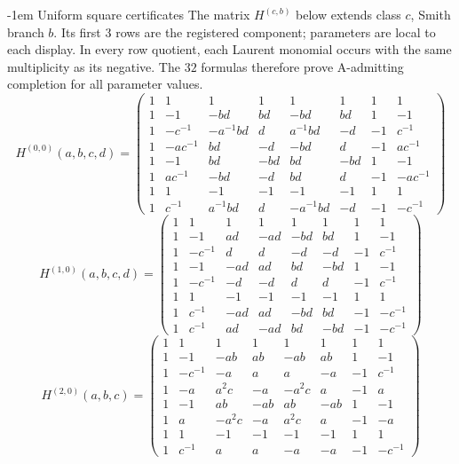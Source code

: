 \documentclass[11pt,a4paper]{article}
\makeatletter
\theoremstyle{plain}
\theoremstyle{definition}
\numberwithin{equation}{section}
\renewcommand\subsection{\@startsection{subsection}{2}{\z@}  {\medskipamount}  {-1em}  {\normalfont\normalsize\bfseries}}
\makeatother
\begin{document}
\subsection{Uniform square certificates}\label{app:uniformcerts}
The matrix $H^{(c,b)}$ below extends class $c$, Smith branch $b$. Its first $3$ rows are the registered component; parameters are local to each display. In every row quotient, each Laurent monomial occurs with the same multiplicity as its negative. The $32$ formulas therefore prove A-admitting completion for all parameter values.
{\small\setlength{\arraycolsep}{5pt}$$H^{(0,0)}(a,b,c,d)=
\begin{pmatrix}
1&1&1&1&1&1&1&1\\1&-1&-bd&bd&-bd&bd&1&-1\\1&-c^{-1}&-a^{-1}bd&d&a^{-1}bd&-d&-1&c^{-1}\\1&-ac^{-1}&bd&-d&-bd&d&-1&ac^{-1}\\1&-1&bd&-bd&bd&-bd&1&-1\\1&ac^{-1}&-bd&-d&bd&d&-1&-ac^{-1}\\1&1&-1&-1&-1&-1&1&1\\1&c^{-1}&a^{-1}bd&d&-a^{-1}bd&-d&-1&-c^{-1}
\end{pmatrix}$$}
\medskip
{\small\setlength{\arraycolsep}{5pt}$$H^{(1,0)}(a,b,c,d)=
\begin{pmatrix}
1&1&1&1&1&1&1&1\\1&-1&ad&-ad&-bd&bd&1&-1\\1&-c^{-1}&d&d&-d&-d&-1&c^{-1}\\1&-1&-ad&ad&bd&-bd&1&-1\\1&-c^{-1}&-d&-d&d&d&-1&c^{-1}\\1&1&-1&-1&-1&-1&1&1\\1&c^{-1}&-ad&ad&-bd&bd&-1&-c^{-1}\\1&c^{-1}&ad&-ad&bd&-bd&-1&-c^{-1}
\end{pmatrix}$$}
\medskip
{\small\setlength{\arraycolsep}{5pt}$$H^{(2,0)}(a,b,c)=
\begin{pmatrix}
1&1&1&1&1&1&1&1\\1&-1&-ab&ab&-ab&ab&1&-1\\1&-c^{-1}&-a&a&a&-a&-1&c^{-1}\\1&-a&a^{2}c&-a&-a^{2}c&a&-1&a\\1&-1&ab&-ab&ab&-ab&1&-1\\1&a&-a^{2}c&-a&a^{2}c&a&-1&-a\\1&1&-1&-1&-1&-1&1&1\\1&c^{-1}&a&a&-a&-a&-1&-c^{-1}
\end{pmatrix}$$}
\end{document}
